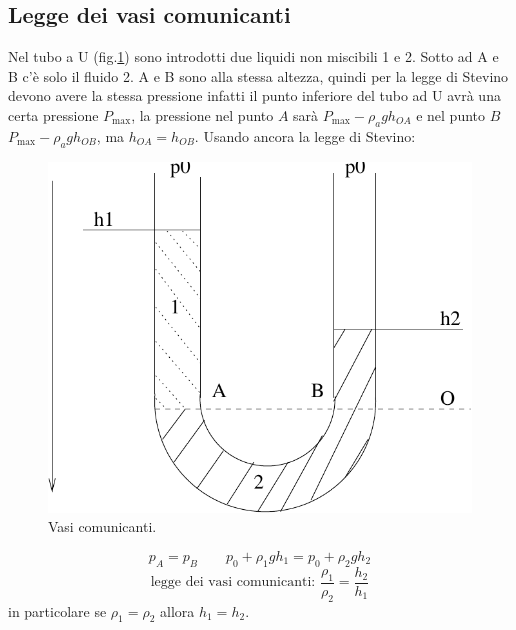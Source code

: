\subsection{Legge dei vasi comunicanti}
Nel tubo a U (fig.\@\ref{vasicom}) sono introdotti due liquidi non miscibili 1 e 2. Sotto ad A e B c'è solo il fluido 2. A e B sono alla stessa altezza, quindi per la legge di Stevino devono avere la stessa pressione infatti il punto inferiore del tubo ad U avrà una certa pressione $P_{\max}$, la pressione nel punto $A$ sarà $P_{\max} - \rho_a g h_{OA}$ e nel punto $B$ $P_{\max} - \rho_a g h_{OB}$, ma $h_{OA}=h_{OB}$. Usando ancora la legge di Stevino:
\begin{figure}[htbp]
   \centering
   \includegraphics[scale=0.5]{immagini/fisica1/vasi_comunicanti}
   \caption{Vasi comunicanti.}
   \label{vasicom}
\end{figure}
\[p_A=p_B\qquad p_0+\rho_1 gh_1=p_0+\rho_2gh_2\]
\[\text{legge dei vasi comunicanti: }\frac{\rho_1}{\rho_2}=\frac{h_2}{h_1}\]
in particolare se $\rho_1=\rho_2$ allora $h_1=h_2$.
